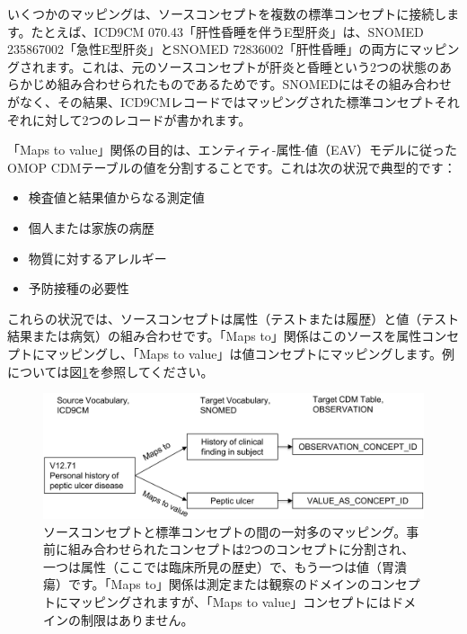 \documentclass[
  11pt]{book}
\providecommand{\tightlist}{%
  \setlength{\itemsep}{0pt}\setlength{\parskip}{0pt}}
\theoremstyle{definition}
\theoremstyle{definition}
\theoremstyle{definition}
\theoremstyle{definition}
\theoremstyle{remark}
\begin{document}
いくつかのマッピングは、ソースコンセプトを複数の標準コンセプトに接続します。たとえば、ICD9CM 070.43「肝性昏睡を伴うE型肝炎」は、SNOMED 235867002「急性E型肝炎」とSNOMED 72836002「肝性昏睡」の両方にマッピングされます。これは、元のソースコンセプトが肝炎と昏睡という2つの状態のあらかじめ組み合わせられたものであるためです。SNOMEDにはその組み合わせがなく、その結果、ICD9CMレコードではマッピングされた標準コンセプトそれぞれに対して2つのレコードが書かれます。

「Maps to value」関係の目的は、エンティティ-属性-値（EAV）モデルに従ったOMOP CDMテーブルの値を分割することです。これは次の状況で典型的です：

\begin{itemize}
\tightlist
\item
  検査値と結果値からなる測定値
\item
  個人または家族の病歴
\item
  物質に対するアレルギー
\item
  予防接種の必要性
\end{itemize}

これらの状況では、ソースコンセプトは属性（テストまたは履歴）と値（テスト結果または病気）の組み合わせです。「Maps to」関係はこのソースを属性コンセプトにマッピングし、「Maps to value」は値コンセプトにマッピングします。例については図\ref{fig:conceptValue}を参照してください。

\begin{figure}

{\centering \includegraphics[width=1\linewidth]{images/StandardizedVocabularies/conceptValue} 

}

\caption{ソースコンセプトと標準コンセプトの間の一対多のマッピング。事前に組み合わせられたコンセプトは2つのコンセプトに分割され、一つは属性（ここでは臨床所見の歴史）で、もう一つは値（胃潰瘍）です。「Maps to」関係は測定または観察のドメインのコンセプトにマッピングされますが、「Maps to value」コンセプトにはドメインの制限はありません。}\label{fig:conceptValue}
\end{figure}
\end{document}
